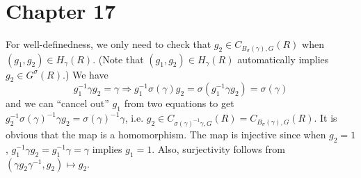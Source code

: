 \newpage
\section{Chapter 17}

\begin{problem} \notfinish
\end{problem}

\begin{problem} \notfinish
\end{problem}

\begin{problem} \notfinish
\end{problem}

\begin{problem} \notfinish
\end{problem}

\begin{problem} \notfinish
\end{problem}

\begin{problem} \notfinish
\end{problem}

\begin{problem} \notfinish
\end{problem}

\begin{problem} \notfinish
\end{problem}

\begin{problem} \notfinish
\end{problem}

\begin{problem} \notfinish
\end{problem}

\begin{problem}
For well-definedness, we only need to check that $g_2 \in C_{B_{\sigma}(\gamma), G}(R)$ when $(g_1, g_2) \in H_\gamma(R)$.
(Note that $(g_1, g_2) \in H_{\gamma}(R)$ automatically implies $g_{2} \in G^{\sigma}(R)$.)
We have 
$$
g_1^{-1}\gamma g_{2} = \gamma \Rightarrow g_{1}^{-1}\sigma(\gamma)g_{2} = \sigma(g_{1}^{-1}\gamma g_{2}) = \sigma(\gamma)
$$
and we can ``cancel out'' $g_1$ from two equations to get $g_{2}^{-1}\sigma(\gamma)^{-1}\gamma g_{2} = \sigma(\gamma)^{-1}\gamma$, i.e. $g_{2} \in C_{\sigma(\gamma)^{-1}\gamma, G}(R) = C_{B_{\sigma}(\gamma), G}(R)$.
It is obvious that the map is a homomorphism.
The map is injective since when $g_2 = 1$, $g_{1}^{-1}\gamma g_{2} = g_{1}^{-1}\gamma = \gamma$ implies $g_{1} = 1$.
Also, surjectivity follows from $(\gamma g_2 \gamma^{-1}, g_2)\mapsto g_2$.

\end{problem}

